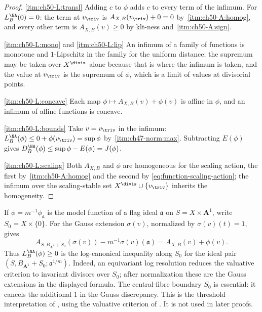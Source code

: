 \begin{proof}
\cref{itm:ch50-L:transl}  Adding $c$ to $\phi$ adds $c$ to every term
of the infimum.  For $L^{\NA}_B(0)=0$: the term at $v_{\triv}$ is
$A_{X,B}(v_{\triv})+0=0$ by
\,\cref{itm:ch50-A:homog}, and every other term
is $A_{X,B}(v)\ge0$ by klt-ness and
\,\cref{itm:ch50-A:sign}.

\cref{itm:ch50-L:mono} and \cref{itm:ch50-L:lip}  An infimum of a family of
functions is monotone and $1$-Lipschitz in the family for the uniform
distance; the supremum may be taken over $X^{\divis}$ alone because that
is where the infimum is taken, and the value at $v_{\triv}$ is the
supremum of $\phi$, which is a limit of values at divisorial points.

\cref{itm:ch50-L:concave}  Each map
$\phi\mapsto A_{X,B}(v)+\phi(v)$ is affine in $\phi$, and an infimum of
affine functions is concave.

\cref{itm:ch50-L:bounds}  Take $v=v_{\triv}$ in the infimum:
$L^{\NA}_B(\phi)\le0+\phi(v_{\triv})=\sup\phi$ by
\,\cref{itm:ch47-norm:max}.  Subtracting
$E(\phi)$ gives $D^{\NA}_B(\phi)\le\sup\phi-E(\phi)=J(\phi)$.

\cref{itm:ch50-L:scaling}  Both $A_{X,B}$ and $\phi$ are homogeneous for
the scaling action, the first by
\,\cref{itm:ch50-A:homog} and the second by
\eqref{eq:function-scaling-action}; the infimum over the scaling-stable set
$X^{\divis}\cup\{v_{\triv}\}$ inherits the homogeneity.
\end{proof}

\begin{remark}
\label{rem:ch50-L-lct}
If $\phi=m^{-1}\phi_{\mathfrak a}$ is the model function of a flag ideal
$\mathfrak a$ on $S=X\times\mathbf A^1$, write $S_0=X\times\{0\}$.
For the Gauss extension $\sigma(v)$, normalized by $\sigma(v)(t)=1$,
 gives
\[
 A_{S,B_{\mathbf A^1}+S_0}(\sigma(v))
       -m^{-1}\sigma(v)(\mathfrak a)
       =A_{X,B}(v)+\phi(v).
\]
Thus $L^{\NA}_B(\phi)\ge0$ is the log-canonical inequality along
$S_0$ for the ideal pair
$(S,B_{\mathbf A^1}+S_0;\mathfrak a^{1/m})$.
Indeed, an equivariant log resolution reduces the valuative criterion
to invariant divisors over $S_0$; after normalization these are the
Gauss extensions in the displayed formula.  The central-fibre boundary
$S_0$ is essential: it cancels the additional $1$ in the Gauss
discrepancy.  This is the threshold interpretation of
\cite[Proposition~7.29]{BHJ17}, using the valuative criterion of
.  It is not used in later proofs.
\end{remark}

